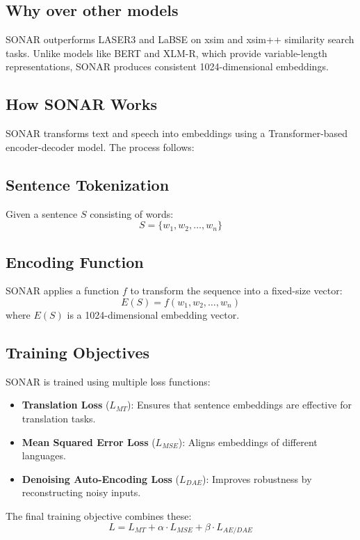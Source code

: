 \subsection{Why over other models }
SONAR outperforms LASER3 and LaBSE on xsim and xsim++ similarity search tasks.
 Unlike models like BERT and XLM-R, which provide variable-length representations, SONAR produces consistent 1024-dimensional embeddings.
\subsection{How SONAR Works}
SONAR transforms text and speech into embeddings using a Transformer-based encoder-decoder model. The process follows:
\subsection{Sentence Tokenization}
Given a sentence $S$ consisting of words:
\begin{equation}
    S = \{w_1, w_2, \dots, w_n\}
\end{equation}

\subsection{Encoding Function}
SONAR applies a function $f$ to transform the sequence into a fixed-size vector:
\begin{equation}
    E(S) = f(w_1, w_2, \dots, w_n)
\end{equation}
where $E(S)$ is a 1024-dimensional embedding vector.

\subsection{Training Objectives}
SONAR is trained using multiple loss functions:
\begin{itemize}
    \item \textbf{Translation Loss} ($L_{MT}$): Ensures that sentence embeddings are effective for translation tasks.
    \item \textbf{Mean Squared Error Loss} ($L_{MSE}$): Aligns embeddings of different languages.
    \item \textbf{Denoising Auto-Encoding Loss} ($L_{DAE}$): Improves robustness by reconstructing noisy inputs.
\end{itemize}
The final training objective combines these:
\begin{equation}
    L = L_{MT} + \alpha \cdot L_{MSE} + \beta \cdot L_{AE/DAE}
\end{equation}

